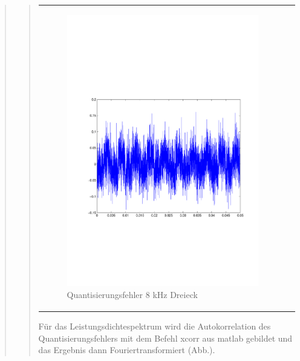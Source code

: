 \begin{quote}
\begin{quote}
\begin{center}
\begin{tabular}{ll}
                \begin{minipage}{0.6\textwidth}
                    \begin{figure}[H]
                        \includegraphics[scale=0.55, trim = 16mm 70mm 16mm 85mm, clip]{Bilder/8kHz_dreieck_Quantisierungsfehler}
                       \caption{Quantisierungsfehler 8 kHz Dreieck}
		              \label{fig:QuantErr 8 kHz Dreieck}
                    \end{figure}
                \end{minipage}
            
            \end{tabular}
            \end{center}
            
            \vspace{2em}
	   	
	   	
	   	
	   	
	   	Für das Leistungsdichtespektrum wird die Autokorrelation des Quantisierungsfehlers mit dem Befehl xcorr aus matlab
	   	gebildet und das Ergebnis dann Fouriertransformiert (Abb.).
	   	
	   	
    	
    	\end{quote}
    
\end{quote}


